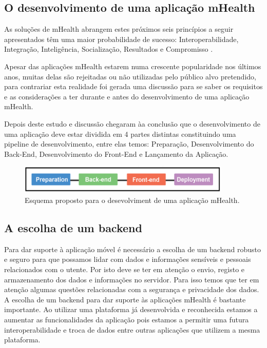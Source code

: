 \subsection{O desenvolvimento de uma aplica\c c\~ao mHealth}

As solu\c c\~oes de mHealth abrangem estes pr\'oximos seis princ\'ipios a seguir apresentados t\^em uma maior probabilidade de sucesso: Interoperabilidade, Integra\c c\~ao, Intelig\^encia, Socializa\c c\~ao, Resultados e Compromisso \cite{mhealthinsights}.
\par
Apesar das aplica\c c\~oes mHealth estarem numa crescente popularidade nos \'ultimos anos, muitas delas s\~ao rejeitadas ou n\~ao utilizadas pelo p\'ublico alvo pretendido, para contrariar esta realidade foi gerada uma discuss\~ao para se saber os requisitos e as considera\c c\~oes a ter durante e antes do desenvolvimento de uma aplica\c c\~ao mHealth.
\par
Depois deste estudo e discuss\~ao chegaram \`aa conclus\~ao que o desenvolvimento de uma aplica\c c\~ao deve estar dividida em 4 partes distintas constituindo uma pipeline de desenvolvimento, entre elas temos:  Prepara\c c\~ao, Desenvolvimento do Back-End, Desenvolvimento do Front-End e Lan\c camento da Aplica\c c\~ao\cite{mhealth-pipeline}.

\begin{figure}[!ht]
  \centering
  \includegraphics[width=0.9\textwidth]{imgs/mhealthDevPipeline.png}
  \caption[Esquema proposto para o desevolvimento de uma aplica\c c\~ao mHealth]{Esquema proposto para o desevolviment de uma aplica\c c\~ao mHealth. \cite{mhealth-pipeline}}
  
  \label{f:mhealthpipeline}
\end{figure}

\subsection{A escolha de um backend}

Para dar suporte à aplicação móvel é necessário a escolha de um backend robusto e seguro para que possamos lidar com dados e informações sensíveis e pessoais relacionados com o utente. Por isto deve se ter em atenção o envio, registo e armazenamento dos dados e informações no servidor. Para isso temos que ter em atenção algumas questões relacionadas com a segurança e privacidade dos dados. A escolha de um backend para dar suporte às aplicações mHealth é bastante importante. Ao utilizar uma plataforma já desenvolvida e reconhecida estamos a aumentar as funcionalidades da aplicação pois estamos a permitir uma futura interoperabilidade e troca de dados entre outras aplicações que utilizem a mesma plataforma.


